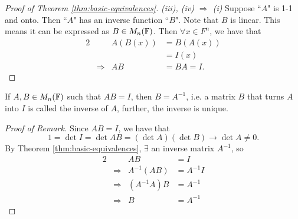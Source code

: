 \begin{proof}[Proof of Theorem \ref{thm:basic-equivalences}]
\textit{(iii), (iv) $\Longrightarrow$ (i)} Suppose ``$A$" is 1-1 and onto. Then ``$A$" has an inverse function ``$B$". Note that $B$ is linear. This means it can be expressed as $B \in M_n(\mathbb F)$. Then $\forall x \in F^n$, we have that
\begin{alignat*}{2}
    && A(B(x)) &= B(A(x)) \\
            &&&= I(x) \\
    &\Longrightarrow & AB &= BA = I.
\end{alignat*}
\end{proof}

\begin{remark*}
If $A,B \in M_n(\mathbb F)$ such that $AB = I$, then $B = A^{-1}$, i.e. a matrix $B$ that turns $A$ into $I$ is called the inverse of $A$, further, the inverse is unique.
\end{remark*}

\begin{proof}[Proof of Remark]
Since $AB = I$, we have that
$$
1 = \det I = \det AB = (\det A)(\det B) \rightarrow \det A \not= 0.
$$
By Theorem \ref{thm:basic-equivalences}, $\exists$ an inverse matrix $A^{-1}$, so
\begin{alignat*}{2}
    && AB &= I \\
    &\Longrightarrow & A^{-1}(AB) &= A^{-1}I \\
    &\Longrightarrow & (A^{-1}A)B &= A^{-1} \\
    &\Longrightarrow & B &= A^{-1}
\end{alignat*}
\end{proof}